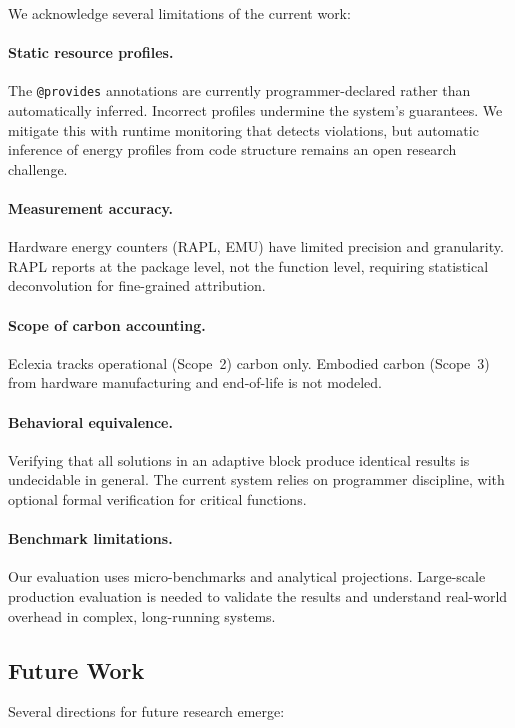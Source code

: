 \documentclass[11pt,a4paper]{article}
\begin{document}
We acknowledge several limitations of the current work:

\paragraph{Static resource profiles.}
The \texttt{@provides} annotations are currently programmer-declared rather than
automatically inferred.  Incorrect profiles undermine the system's guarantees.
We mitigate this with runtime monitoring that detects violations, but automatic
inference of energy profiles from code structure remains an open research
challenge.

\paragraph{Measurement accuracy.}
Hardware energy counters (RAPL, EMU) have limited precision and granularity.
RAPL reports at the package level, not the function level, requiring
statistical deconvolution for fine-grained attribution.

\paragraph{Scope of carbon accounting.}
Eclexia tracks operational (Scope~2) carbon only.  Embodied carbon (Scope~3)
from hardware manufacturing and end-of-life is not modeled.

\paragraph{Behavioral equivalence.}
Verifying that all solutions in an adaptive block produce identical results
is undecidable in general.  The current system relies on programmer discipline,
with optional formal verification for critical functions.

\paragraph{Benchmark limitations.}
Our evaluation uses micro-benchmarks and analytical projections.  Large-scale
production evaluation is needed to validate the results and understand
real-world overhead in complex, long-running systems.

\subsection{Future Work}

Several directions for future research emerge:
\end{document}

